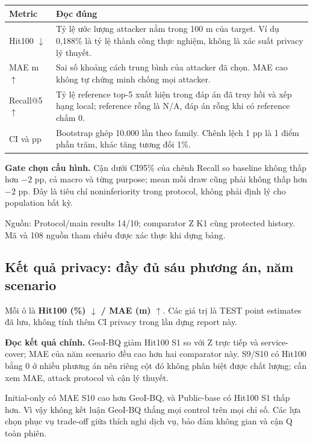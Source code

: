 \documentclass[10pt,a4paper]{article}
\newcommand{\source}[1]{\par{\footnotesize\color{gray}Nguồn: #1}\par}
\begin{document}
\begin{tabularx}{\linewidth}{@{}P{3cm}Y@{}}\toprule
\textbf{Metric} & \textbf{Đọc đúng}\\\midrule
Hit100 $\downarrow$ & Tỷ lệ ước lượng attacker nằm trong 100 m của target. Ví dụ 0,188\% là tỷ lệ thành công thực nghiệm, không là xác suất privacy lý thuyết.\\
MAE m $\uparrow$ & Sai số khoảng cách trung bình của attacker đã chọn. MAE cao không tự chứng minh chống mọi attacker.\\
Recall@5 $\uparrow$ & Tỷ lệ reference top-5 xuất hiện trong đáp án đã truy hồi và xếp hạng local; reference rỗng là N/A, đáp án rỗng khi có reference chấm 0.\\
CI và pp & Bootstrap ghép 10.000 lần theo family. Chênh lệch 1 pp là 1 điểm phần trăm, khác tăng tương đối 1\%.\\\bottomrule
\end{tabularx}

\textbf{Gate chọn cấu hình.} Cận dưới CI95\% của chênh Recall so baseline không thấp hơn $-2$ pp,
cả macro và từng purpose; mean mỗi draw cũng phải không thấp hơn $-2$ pp.
Đây là tiêu chí noninferiority trong protocol, không phải định lý cho population bất kỳ.

\source{Protocol/main results 14/10; comparator Z K1 cùng protected history. Mã và 108 nguồn tham chiếu được xác thực khi dựng bảng.}

\clearpage
\subsection{Kết quả privacy: đầy đủ sáu phương án, năm scenario}
Mỗi ô là \textbf{Hit100 (\%) $\downarrow$ / MAE (m) $\uparrow$}. Các giá trị là TEST point estimates
đã lưu, không tính thêm CI privacy trong lần dựng report này.
\begin{small}\end{small}

\textbf{Đọc kết quả chính.} GeoI-BQ giảm Hit100 S1 so với Z trực tiếp và service-cover; MAE của năm scenario
đều cao hơn hai comparator này. S9/S10 có Hit100 bằng 0 ở nhiều phương án nên riêng cột đó không phân biệt
được chất lượng; cần xem MAE, attack protocol và cận lý thuyết.

Initial-only có MAE S10 cao hơn GeoI-BQ, và Public-base có Hit100 S1 thấp hơn. Vì vậy không kết luận
GeoI-BQ thắng mọi control trên mọi chỉ số. Các lựa chọn phục vụ trade-off giữa thích nghi dịch vụ,
bảo đảm không gian và cận Q toàn phiên.
\end{document}
